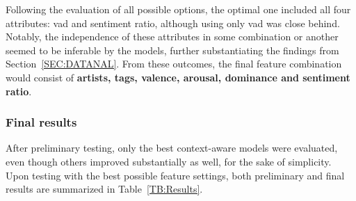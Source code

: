 Following the evaluation of all possible options, the optimal one included all four attributes: \acs{vad} and sentiment ratio, although using only \acs{vad} was close behind. Notably, the independence of these attributes in some combination or another seemed to be inferable by the models, further substantiating the findings from Section~\ref{SEC:DATANAL}. From these outcomes, the final feature combination would consist of \textbf{artists, tags, valence, arousal, dominance and sentiment ratio}.

\subsubsection{Final results}

After preliminary testing, only the best context-aware models were evaluated, even though others improved substantially as well, for the sake of simplicity. Upon testing with the best possible feature settings, both preliminary and final results are summarized in Table~\ref{TB:Results}.

